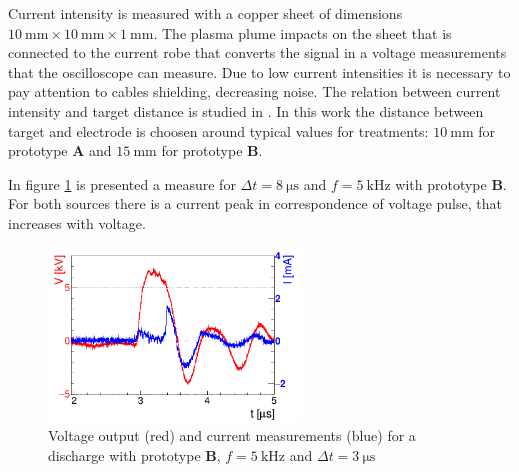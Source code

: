 Current intensity is measured with a copper sheet of dimensions $\SI{10}{\milli\meter} \times \SI{10}{\milli\meter} \times \SI{1}{\milli\meter}$. The plasma plume impacts on the sheet that is connected to the current robe that converts the signal in a voltage measurements that the oscilloscope can measure. Due to low current intensities it is necessary to pay attention to cables shielding, decreasing noise.
The relation between current intensity and target distance is studied in \cite{unipd:ceciliaDBD}. In this work the distance between target and electrode is choosen around typical values for treatments: $\SI{10}{\milli\meter}$ for prototype \textbf{A} and $\SI{15}{\milli\meter}$ for prototype \textbf{B}.

In figure \ref{fig:tens_curr} is presented a measure for $\Delta t = \SI{8}{\micro\second}$ and $f =\SI{5}{\kilo\hertz}$ with prototype \textbf{B}. For both sources there is a current peak in correspondence of voltage pulse, that increases with voltage.
\begin{figure}
\centering
 \includegraphics[width=0.6\textwidth]{Images/Electric/espiccopos_corrente.png}
 \caption{Voltage output (red) and current measurements (blue) for a discharge  with prototype \textbf{B}, $f = \SI{5}{\kilo\hertz}$ and $\Delta t = \SI{3}{\micro\second}$}
 \label{fig:tens_curr}
\end{figure}

